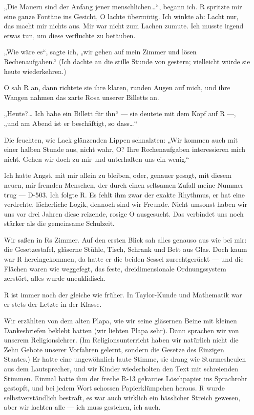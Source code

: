 „Die Mauern sind der Anfang jener menschlichen\ldots{}“, begann ich. R
spritzte mir eine ganze Fontäne ins Gesicht, O lachte übermütig.
Ich winkte ab: Lacht nur, das macht mir nichts aus. Mir war nicht
zum Lachen zumute. Ich musste irgend etwas tun, um diese verfluchte
\wurzel{} zu betäuben.

„Wie wäre es“, sagte ich, „wir gehen auf mein Zimmer und lösen
Rechenaufgaben.“ (Ich dachte an die stille Stunde von gestern;
vielleicht würde sie heute wiederkehren.)

O sah R an, dann richtete sie ihre klaren, runden Augen auf mich,
und ihre Wangen nahmen das zarte Rosa unserer Billetts an.

„Heute?\ldots{} Ich habe ein Billett für ihn“ — sie deutete mit dem Kopf
auf R —, „und am Abend ist er beschäftigt, so dass\ldots{}“

Die feuchten, wie Lack glänzenden Lippen schnalzten: „Wir kommen
auch mit einer halben Stunde aus, nicht wahr, O? Ihre
Rechenaufgaben interessieren mich nicht. Gehen wir doch zu mir und
unterhalten uns ein wenig.“

Ich hatte Angst, mit mir allein zu
bleiben, oder, genauer gesagt, mit diesem neuen, mir fremden
Menschen, der durch einen seltsamen Zufall meine Nummer trug —
D-503. Ich folgte R. Es fehlt ihm zwar der exakte Rhythmus, er hat
eine verdrehte, lächerliche Logik, dennoch sind wir Freunde. Nicht
umsonst haben wir uns vor drei Jahren diese reizende, rosige O
ausgesucht. Das verbindet uns noch stärker als die gemeinsame
Schulzeit.

Wir saßen in Rs Zimmer. Auf den ersten Blick sah alles
genauso aus wie bei mir: die Gesetzestafel, gläserne Stühle, Tisch,
Schrank und Bett aus Glas. Doch kaum war R hereingekommen, da hatte
er die beiden Sessel zurechtgerückt — und die Flächen waren wie
weggefegt, das feste, dreidimensionale Ordnungssystem zerstört,
alles wurde uneuklidisch.

R ist immer noch der gleiche wie früher. In Taylor-Kunde und
Mathematik war er stets der Letzte in der Klasse.

Wir erzählten von
dem alten Plapa, wie wir seine gläsernen Beine mit kleinen
Dankesbriefen beklebt hatten (wir liebten Plapa sehr). Dann
sprachen wir von unserem Religionslehrer. (Im Religionsunterricht
haben wir natürlich nicht die Zehn Gebote unserer Vorfahren
gelernt, sondern die Gesetze des Einzigen Staates.) Er hatte eine
ungewöhnlich laute Stimme, sie drang wie Sturmesheulen aus dem
Lautsprecher, und wir Kinder wiederholten den Text mit schreienden
Stimmen. Einmal hatte ihm der freche R-13 gekautes Löschpapier ins
Sprachrohr gestopft, und bei jedem Wort schossen Papierklümpchen
heraus. R wurde selbstverständlich bestraft, es war auch wirklich
ein hässlicher Streich gewesen, aber wir lachten alle — ich muss
gestehen, ich auch.

